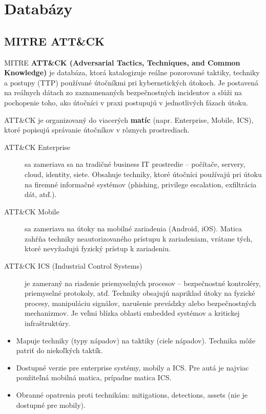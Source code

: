 \documentclass[11pt]{article}
\begin{document}
\section{Databázy}

\subsection{MITRE ATT\&CK}

MITRE \textbf{ATT\&CK (Adversarial Tactics, Techniques, and Common Knowledge)} je databáza, ktorá katalogizuje reálne pozorované taktiky, techniky a postupy (TTP) používané útočníkmi pri kybernetických útokoch. Je postavená na reálnych dátach zo zaznamenaných bezpečnostných incidentov a slúži na pochopenie toho, ako útočníci v praxi postupujú v jednotlivých fázach útoku.

ATT\&CK je organizovaný do viacerých \textbf{matíc} (napr. Enterprise, Mobile, ICS), ktoré popisujú správanie útočníkov v rôznych prostrediach.

\begin{description}
    \item[ATT\&CK Enterprise] sa zameriava sa na tradičné business IT prostredie -- počítače, servery, cloud, identity, siete. Obsahuje techniky, ktoré útočníci používajú pri útoku na firemné informačné systémov (phishing, privilege escalation, exfiltrácia dát, atď.).

    \item[ATT\&CK Mobile] sa zameriava na útoky na mobilné zariadenia (Android, iOS). Matica zahŕňa techniky neautorizovaného prístupu k zariadeniam, vrátane tých, ktoré nevyžadujú fyzický prístup k zariadeniu.

    \item[ATT\&CK ICS (Industrial Control Systems)] je zameraný na riadenie priemyselných procesov -- bezpečnostné kontroléry, priemyselné protokoly, atď. Techniky obsajujú napriklad útoky na fyzické procesy, manipuláciu signálov, narušenie prevádzky alebo bezpečnostných mechanizmov. Je veľmi blízka oblasti embedded systémov a kritickej infraštruktúry.
\end{description}

\begin{itemize}
    \item Mapuje techniky (typy nápadov) na taktiky (ciele nápadov). Technika môže patriť do niekoľkých taktík.
    \item Dostupné verzie pre enterprise systémy, mobily a ICS. Pre autá je najviac použiteľná mobilná matica, prípadne matica ICS.
    \item Obranné opatrenia proti technikám: mitigations, detections, assets (nie je dostupné pre mobily).
\end{itemize}
\end{document}
